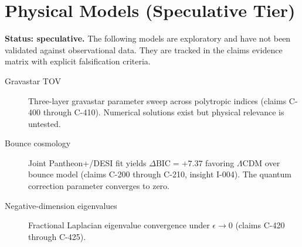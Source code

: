 \documentclass{article}
\theoremstyle{definition}
\theoremstyle{plain}
\theoremstyle{remark}
\begin{document}
\section{Physical Models (Speculative Tier)}
\label{sec:speculative}

\textbf{Status: speculative.}  The following models are exploratory and have
not been validated against observational data.  They are tracked in the claims
evidence matrix with explicit falsification criteria.

\begin{description}
  \item[Gravastar TOV] Three-layer gravastar parameter sweep across polytropic
    indices (claims C-400 through C-410).  Numerical solutions exist but physical
    relevance is untested.
  \item[Bounce cosmology] Joint Pantheon+/DESI fit yields $\Delta\text{BIC} = +7.37$
    favoring $\Lambda$CDM over bounce model (claims C-200 through C-210,
    insight I-004).  The quantum correction parameter converges to zero.
  \item[Negative-dimension eigenvalues] Fractional Laplacian eigenvalue
    convergence under $\epsilon \to 0$ (claims C-420 through C-425).
\end{description}

\appendix






\end{document}
